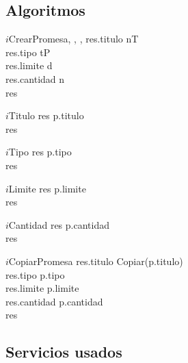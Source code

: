 \subsection{Algoritmos}

	\begin{algorithm}{$i$CrearPromesa}{, , , }{}
	res.titulo \leftarrow nT\\
	res.tipo \leftarrow tP \\
	res.limite \leftarrow d \\
	res.cantidad \leftarrow n \\
	\RETURN res
	\end{algorithm}
	
	\begin{algorithm}{$i$Titulo}{}{}
	res \leftarrow p.titulo \\
	\RETURN res
	\end{algorithm}

	\begin{algorithm}{$i$Tipo}{}{}
	res \leftarrow p.tipo \\
	\RETURN res
	\end{algorithm}
	
	\begin{algorithm}{$i$Limite}{}{}
	res \leftarrow p.limite \\
	\RETURN res
	\end{algorithm}
	
	\begin{algorithm}{$i$Cantidad}{}{}
	res \leftarrow p.cantidad \\
	\RETURN res
	\end{algorithm}

	\begin{algorithm}{$i$CopiarPromesa}{}{}
	res.titulo \leftarrow Copiar(p.titulo)\\
	res.tipo \leftarrow p.tipo \\
	res.limite \leftarrow p.limite \\
	res.cantidad \leftarrow p.cantidad \\
	\RETURN res
	\end{algorithm}
	
	
\subsection{Servicios usados}

\newpage
